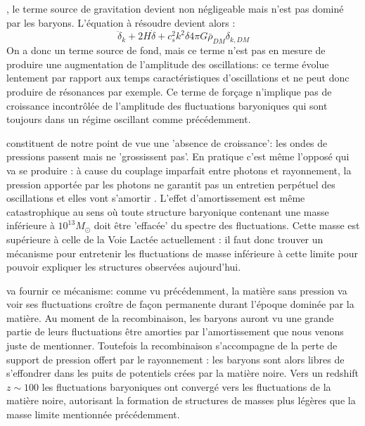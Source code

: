 , le terme source de gravitation devient non négligeable mais n'est pas dominé par les baryons. L'équation à résoudre devient alors :
\begin{equation}
\ddot \delta_k+2H\dot \delta +c_s^2k^2 \delta 4\pi G \bar\rho_{DM} \delta_{k,DM}
\end{equation}
On a donc un terme source de fond, mais ce terme n'est pas en mesure de produire une augmentation de l'amplitude des oscillations: ce terme évolue lentement par rapport aux temps caractéristiques d'oscillations et ne peut donc produire de résonances par exemple. Ce terme de forçage n'implique pas de croissance incontrôlée de l'amplitude des fluctuations baryoniques qui sont toujours dans un régime oscillant comme précédemment.

 constituent de notre point de vue une 'absence de croissance': les ondes de pressions passent mais ne 'grossissent pas'. En pratique c'est même l'opposé qui va se produire : à cause du couplage imparfait entre photons et rayonnement, la pression apportée par les photons ne garantit pas un entretien perpétuel des oscillations et elles vont s'amortir . L'effet d'amortissement est même catastrophique au sens où toute structure baryonique contenant une masse inférieure à $10^{13} M_\odot$  doit être 'effacée' du spectre des fluctuations. Cette masse est supérieure à celle de la Voie Lactée actuellement : il faut donc trouver un mécanisme pour entretenir les fluctuations de masse inférieure à cette limite pour pouvoir expliquer les structures observées aujourd'hui.

 va fournir ce mécanisme: comme vu précédemment, la matière sans pression va voir ses fluctuations croître de façon permanente durant l'époque dominée par la matière. Au moment de la recombinaison, les baryons auront vu une grande partie de leurs fluctuations être amorties par l'amortissement que nous venons juste de mentionner. Toutefois la recombinaison s'accompagne de la perte de support de pression offert par le rayonnement : les baryons sont alors libres de s'effondrer dans les puits de potentiels crées par la matière noire. Vers un redshift $z\sim 100$ les fluctuations baryoniques ont convergé vers les fluctuations de la matière noire, autorisant la formation de structures de masses plus légères que la masse limite mentionnée précédemment.

